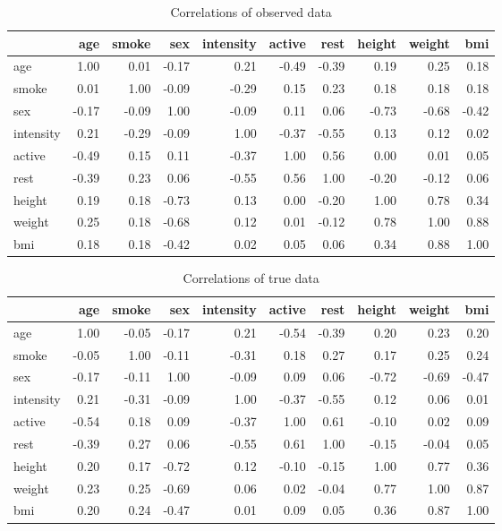 \documentclass[
]{article}
\begin{document}
\begin{table}

\caption{\label{tab:corObs}Correlations of observed data}
\centering
\begin{tabular}[t]{l|r|r|r|r|r|r|r|r|r}
\hline
  & age & smoke & sex & intensity & active & rest & height & weight & bmi\\
\hline
age & 1.00 & 0.01 & -0.17 & 0.21 & -0.49 & -0.39 & 0.19 & 0.25 & 0.18\\
\hline
smoke & 0.01 & 1.00 & -0.09 & -0.29 & 0.15 & 0.23 & 0.18 & 0.18 & 0.18\\
\hline
sex & -0.17 & -0.09 & 1.00 & -0.09 & 0.11 & 0.06 & -0.73 & -0.68 & -0.42\\
\hline
intensity & 0.21 & -0.29 & -0.09 & 1.00 & -0.37 & -0.55 & 0.13 & 0.12 & 0.02\\
\hline
active & -0.49 & 0.15 & 0.11 & -0.37 & 1.00 & 0.56 & 0.00 & 0.01 & 0.05\\
\hline
rest & -0.39 & 0.23 & 0.06 & -0.55 & 0.56 & 1.00 & -0.20 & -0.12 & 0.06\\
\hline
height & 0.19 & 0.18 & -0.73 & 0.13 & 0.00 & -0.20 & 1.00 & 0.78 & 0.34\\
\hline
weight & 0.25 & 0.18 & -0.68 & 0.12 & 0.01 & -0.12 & 0.78 & 1.00 & 0.88\\
\hline
bmi & 0.18 & 0.18 & -0.42 & 0.02 & 0.05 & 0.06 & 0.34 & 0.88 & 1.00\\
\hline
\end{tabular}
\end{table}

\begin{table}

\caption{\label{tab:corTrue}Correlations of true data}
\centering
\begin{tabular}[t]{l|r|r|r|r|r|r|r|r|r}
\hline
  & age & smoke & sex & intensity & active & rest & height & weight & bmi\\
\hline
age & 1.00 & -0.05 & -0.17 & 0.21 & -0.54 & -0.39 & 0.20 & 0.23 & 0.20\\
\hline
smoke & -0.05 & 1.00 & -0.11 & -0.31 & 0.18 & 0.27 & 0.17 & 0.25 & 0.24\\
\hline
sex & -0.17 & -0.11 & 1.00 & -0.09 & 0.09 & 0.06 & -0.72 & -0.69 & -0.47\\
\hline
intensity & 0.21 & -0.31 & -0.09 & 1.00 & -0.37 & -0.55 & 0.12 & 0.06 & 0.01\\
\hline
active & -0.54 & 0.18 & 0.09 & -0.37 & 1.00 & 0.61 & -0.10 & 0.02 & 0.09\\
\hline
rest & -0.39 & 0.27 & 0.06 & -0.55 & 0.61 & 1.00 & -0.15 & -0.04 & 0.05\\
\hline
height & 0.20 & 0.17 & -0.72 & 0.12 & -0.10 & -0.15 & 1.00 & 0.77 & 0.36\\
\hline
weight & 0.23 & 0.25 & -0.69 & 0.06 & 0.02 & -0.04 & 0.77 & 1.00 & 0.87\\
\hline
bmi & 0.20 & 0.24 & -0.47 & 0.01 & 0.09 & 0.05 & 0.36 & 0.87 & 1.00\\
\hline
\end{tabular}
\end{table}
\end{document}

